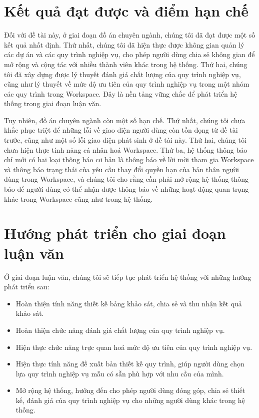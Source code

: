 \section{Kết quả đạt được và điểm hạn chế}
Đối với đề tài này, ở giai đoạn đồ án chuyên ngành, chúng tôi đã đạt được một số kết quả nhất định.
Thứ nhất, chúng tôi đã hiện thực được không gian quản lý các dự án và các quy trình nghiệp vụ, cho phép người dùng chia sẻ không gian 
để mở rộng và cộng tác với nhiều thành viên khác trong hệ thống. Thứ hai, chúng tôi đã xây dựng được lý thuyết đánh giá chất lượng của quy
trình nghiệp vụ, cũng như lý thuyết về mức độ ưu tiên của quy trình nghiệp vụ trong một nhóm các quy trình trong Workspace. Đây là nền tảng
vững chắc để phát triển hệ thống trong giai đoạn luận văn.
\par
Tuy nhiên, đồ án chuyên ngành còn một số hạn chế. Thứ nhất, chúng tôi chưa khắc phục triệt để những lỗi về giao diện người dùng còn tồn
đọng từ đề tài trước, cũng như một số lỗi giao diện phát sinh ở đề tài này. Thứ hai, chúng tôi chưa hiện thực tính năng cá nhân hoá
Workspace. Thứ ba, hệ thống thông báo chỉ mới có hai loại thông báo cơ bản là thông báo về lời mời tham gia Workspace và thông báo trạng thái
của yêu cầu thay đổi quyền hạn của bản thân người dùng trong Workspace, và chúng tôi cho rằng cần phải mở rộng hệ thống thông báo để
người dùng có thể nhận được thông báo về những hoạt động quan trọng khác trong Workspace cũng như trong hệ thống.

\section{Hướng phát triển cho giai đoạn luận văn}
Ở giai đoạn luận văn, chúng tôi sẽ tiếp tục phát triển hệ thống với những hướng phát triển sau:
\begin{itemize}
    \item Hoàn thiện tính năng thiết kế bảng khảo sát, chia sẻ và thu nhận kết quả khảo sát.
    \item Hoàn thiện chức năng đánh giá chất lượng của quy trình nghiệp vụ.
    \item Hiện thực chức năng trực quan hoá mức độ ưu tiên của quy trình nghiệp vụ.
    \item Hiện thực tính năng đề xuất bản thiết kế quy trình, giúp người dùng chọn lựa quy trình nghiệp vụ mẫu có sẵn phù hợp với nhu cầu của mình.
    \item Mở rộng hệ thống, hướng đến cho phép người dùng đóng góp, chia sẻ thiết kế, đánh giá của quy trình nghiệp vụ cho những người dùng khác trong hệ thống.
\end{itemize}

